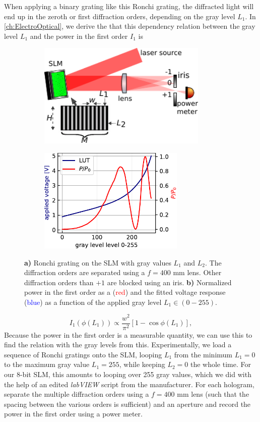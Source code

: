 When applying a binary grating like this Ronchi grating, the diffracted light will end up in the zeroth or first diffraction orders, depending on the gray level $L_1$.
In \cref{ch:ElectroOptical}, we derive the that this dependency relation between the gray level $L_1$ and the power in the first order $I_1$ is
\begin{figure}
	\begin{subfigure}{.51\linewidth}
		\flushleft
		\includegraphics[height=5cm]{figures/LUTcalibrationSetup.pdf}
		\caption{}
		\label{fig:LUTCalibrationSetup}
	\end{subfigure}
	\hfill
	\begin{subfigure}{.48\linewidth}
		\flushright
		\includegraphics[height=5cm]{figures/LUTplot.pdf}
		\caption{}
		\label{fig:LUTcalibration}
	\end{subfigure}
	\caption{\textsf{\textbf{a)}} Ronchi grating on the SLM with gray values $L_1$ and $L_2$. 
	The diffraction orders are separated using a $f=400$ mm lens. 
	Other diffraction orders than $+1$ are blocked using an iris. 
	\textsf{\textbf{b)}} Normalized power in the first order as a (\textcolor{red}{red}) and the fitted voltage response (\textcolor{blue}{blue}) as a function of the applied gray level $L_1 \in (0-255)$.}
\end{figure}

\begin{equation}\label{eq:IntensityFirstOrder}
    I_1(\phi(L_1)) \propto
    \frac{w^2}{\pi^2} \left[ 
    1-\cos{\phi(L_1)}
    \right],
\end{equation}
Because the power in the first order is a measurable quantity, we can use this to find the relation with the gray levels from this.
Experimentally, we load a sequence of Ronchi gratings onto the SLM, looping $L_1$ from the minimum $L_1=0$ to the maximum gray value $L_1=255$, while keeping $L_2 =0$ the whole time.
For our 8-bit SLM, this amounts to looping over 255 gray values, which we did with the help of an edited \textit{labVIEW} script from the manufacturer.
For each hologram, separate the multiple diffraction orders using a $f=400$ mm lens (such that the spacing between the various orders is sufficient) and an aperture and record the power in the first order using a power meter.

